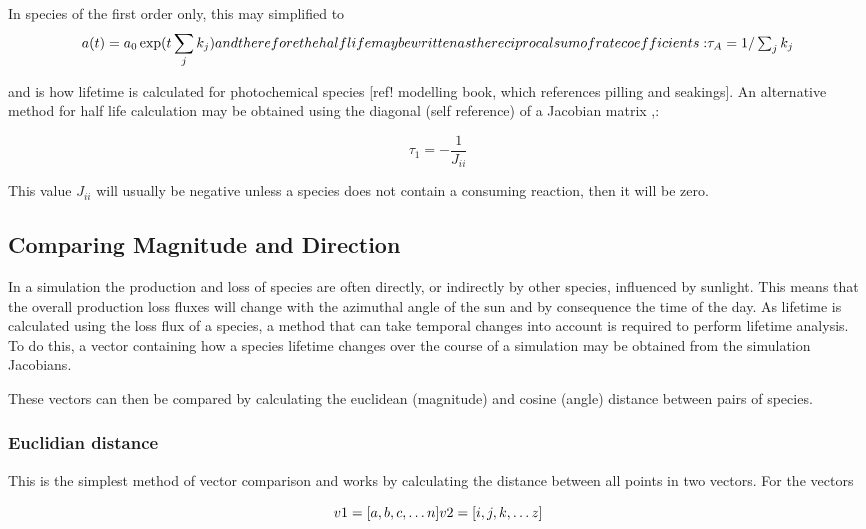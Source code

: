 In species of the first order only, this may simplified to
\begin{equation}
a(t) = a_0 \exp (t  \sum_j k_j )
$$ and therefore the half life may be written as the reciprocal sum of rate coefficients: $$
\tau_A = 1 / \sum_j k_j
\end{equation}

and is how lifetime is calculated for photochemical species [ref! modelling book, which references pilling and seakings]. An alternative method for half life calculation may be obtained using the diagonal (self reference) of a Jacobian matrix ,\citep{kinetics,lifetime}:

\begin{equation}
\tau_1 = - \frac{1}{J_{ii}}
\end{equation}

This value $J_{ii}$ will usually be negative unless a species does not contain a consuming reaction, then it will be zero.

\subsection{Comparing Magnitude and Direction}
In a simulation the production and loss of species are often directly, or indirectly by other species, influenced by sunlight. This means that the overall production loss fluxes will change with the azimuthal angle of the sun and by consequence the time of the day. As lifetime is calculated using the loss flux of a species, a method that can take temporal changes into account is required to perform lifetime analysis. To do this, a vector containing how a species lifetime changes over the course of a simulation may be obtained from the simulation Jacobians. 

These vectors can then be compared by calculating the euclidean (magnitude) and cosine (angle) distance between pairs of species.  

\subsubsection{Euclidian distance} \label{sec:euclid}
This is the simplest method of vector comparison and works by calculating the distance between all points in two vectors. For the vectors

\begin{equation}
v1 = [ a,b,c, \dots n ]
$$$$
v2 = [ i,j,k, \dots z ]
\end{equation}

